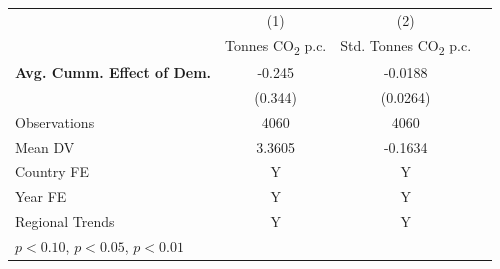 \begin{tabular}{l*{3}{c}}
\hline
            &\multicolumn{1}{c}{(1)}&\multicolumn{1}{c}{(2)}\\
            &\multicolumn{1}{c}{Tonnes CO\textsubscript{2} p.c.}&\multicolumn{1}{c}{Std. Tonnes CO\textsubscript{2} p.c.}\\
\hline
\textbf{Avg. Cumm. Effect of Dem.}&      -0.245         &     -0.0188         \\
            &     (0.344)         &    (0.0264)         \\
\midrule
Observations&        4060         &        4060         \\
Mean DV     &      3.3605         &     -0.1634         \\
Country FE  &           Y         &           Y         \\
Year FE     &           Y         &           Y         \\
Regional Trends&           Y         &           Y         \\
\hline
\multicolumn{3}{l}{\footnotesize \sym{*} \(p<0.10\), \sym{**} \(p<0.05\), \sym{***} \(p<0.01\)}\\
\end{tabular}
